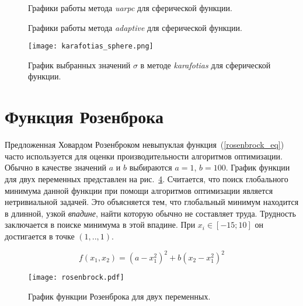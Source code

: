 \begin{figure}
  \centering
  \caption{ Графики работы метода \textit{uarpc} для сферической функции.}
  \label{uarpc_sphere_plot}
\end{figure}

\begin{figure}
  \centering
  \caption{ Графики работы метода \textit{adaptive} для сферической функции.}
  \label{adaptive_sphere_plot}
\end{figure}

\begin{figure}
  \centering
  \texttt{[image: karafotias\_sphere.png]}
  \caption{График выбранных значений $\sigma$ в методе \textit{karafotias} для сферической функции.}
  \label{karafotias_sphere}
\end{figure}


\section{Функция Розенброка}

Предложенная Ховардом Розенброком невыпуклая функция~(\ref{rosenbrock_eq}) часто используется для оценки производительности алгоритмов оптимизации. Обычно в качестве значений $a$ и $b$ выбираются $a = 1$, $b = 100$. График функции для двух переменных представлен на рис.~\ref{rosenbrock_plot}. Считается, что поиск глобального минимума данной функции при помощи алгоритмов оптимизации является нетривиальной задачей. Это объясняется тем, что глобальный минимум находится в длинной, узкой \textit{впадине}, найти которую обычно не составляет труда. Трудность заключается в поиске минимума в этой впадине. При $x_i \in [-15; 10]$ он достигается в точке $(1,..,1)$.

\begin{equation}
\label{rosenbrock_eq}
f(x_1, x_2) = (a - x_1^2)^2 + b(x_2 - x_1^2)^2
\end{equation}


\begin{figure}
    \centering
    \texttt{[image: rosenbrock.pdf]}
    \caption{График функции Розенброка для двух переменных.}
    \label{rosenbrock_plot}
\end{figure}

